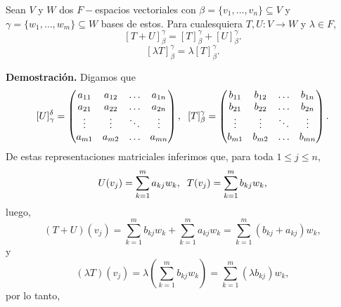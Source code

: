 \begin{prop}
Sean
$V$ y $W$ dos $F-$espacios vectoriales con $\beta = \{ v_{1}, \ldots , 
v_{n} \} \subseteq V$ y 
$\gamma = \{ w_{1}, \ldots , w_{m}\} \subseteq W$ bases de estos. 
Para cualesquiera $T, U :V \longrightarrow W$
y $\lambda \in F$, 
\begin{equation}
	\label{eq: suma de matrices transf lin}
	[T + U]_{\beta}^{\gamma} = [T]_{\beta}^{\gamma} + 
[U]_{\beta}^{\gamma}.
\end{equation}
\begin{equation}
	\label{eq: mult escalar de matrices transf lin}
	[\lambda T]_{\beta}^{\gamma} = \lambda [T]_{\beta}^{\gamma}.
\end{equation}
\end{prop}
\textbf{Demostración.}
Digamos que
\[
[U]_{\gamma}^{\delta} = 
\begin{pmatrix}
	a_{11} & a_{12} & \ldots & a_{1n} \\
	a_{21} & a_{22} & \ldots & a_{2n} \\
	\vdots & \vdots & \ddots & \vdots \\
	a_{m1} & a_{m2} & \ldots & a_{mn}
\end{pmatrix},
\hspace{0.2cm}
[T]_{\beta}^{\gamma} = 
\begin{pmatrix}
	b_{11} & b_{12} & \ldots & b_{1n} \\
	b_{21} & b_{22} & \ldots & b_{2n} \\
	\vdots & \vdots & \ddots & \vdots \\
	b_{m1} & b_{m2} & \ldots & b_{mn}
\end{pmatrix}.
\]
De estas representaciones matriciales inferimos que,
para toda $1 \leq j \leq n$,
\[
U(v_{j}) = \sum_{k=1}^{m} a_{kj} w_{k},
\hspace{0.2cm}
T(v_{j}) = \sum_{k=1}^{m} b_{kj} w_{k},
\]
luego,
\[
(T + U)(v_{j}) = \sum_{k=1}^{m} b_{kj} w_{k} +
\sum_{k=1}^{m} a_{kj} w_{k}
= \sum_{k=1}^{m} (b_{kj} + a_{kj}) w_{k},
\]
y
\[
(\lambda T)(v_{j}) = 
\lambda \left( \sum_{k=1}^{m} b_{kj} w_{k} \right) 
= \sum_{k=1}^{m} (\lambda b_{kj}) w_{k},
\]
por lo tanto,

